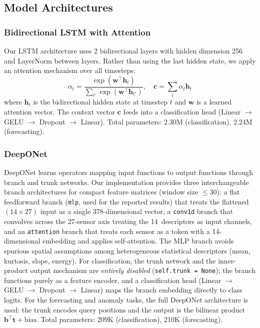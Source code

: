 \documentclass[conference]{IEEEtran}
\begin{document}
\subsection{Model Architectures}

\subsubsection{Bidirectional LSTM with Attention}

Our LSTM architecture uses 2 bidirectional layers with hidden dimension 256 and LayerNorm between layers. Rather than using the last hidden state, we apply an attention mechanism over all timesteps:
\begin{equation}
    \alpha_t = \frac{\exp(\mathbf{w}^\top \mathbf{h}_t)}{\sum_{t'} \exp(\mathbf{w}^\top \mathbf{h}_{t'})}, \quad
    \mathbf{c} = \sum_t \alpha_t \mathbf{h}_t
\end{equation}
where $\mathbf{h}_t$ is the bidirectional hidden state at timestep $t$ and $\mathbf{w}$ is a learned attention vector. The context vector $\mathbf{c}$ feeds into a classification head (Linear $\to$ GELU $\to$ Dropout $\to$ Linear). Total parameters: 2.30M (classification), 2.24M (forecasting).

\subsubsection{DeepONet}

DeepONet \cite{deeponet} learns operators mapping input functions to output functions through branch and trunk networks. Our implementation provides three interchangeable branch architectures for compact feature matrices (window size $\leq 30$): a flat feedforward branch (\texttt{mlp}, used for the reported results) that treats the flattened $(14 \times 27)$ input as a single 378-dimensional vector, a \texttt{conv1d} branch that convolves across the 27-sensor axis treating the 14~descriptors as input channels, and an \texttt{attention} branch that treats each sensor as a token with a 14-dimensional embedding and applies self-attention. The MLP branch avoids spurious spatial assumptions among heterogeneous statistical descriptors (mean, kurtosis, slope, energy). For classification, the trunk network and the inner-product output mechanism are \emph{entirely disabled} (\texttt{self.trunk = None}); the branch functions purely as a feature encoder, and a classification head (Linear $\to$ GELU $\to$ Dropout $\to$ Linear) maps the branch embedding directly to class logits. For the forecasting and anomaly tasks, the full DeepONet architecture is used: the trunk encodes query positions and the output is the bilinear product $\mathbf{b}^\top \mathbf{t} + \text{bias}$. Total parameters: 209K (classification), 210K (forecasting).
\end{document}

